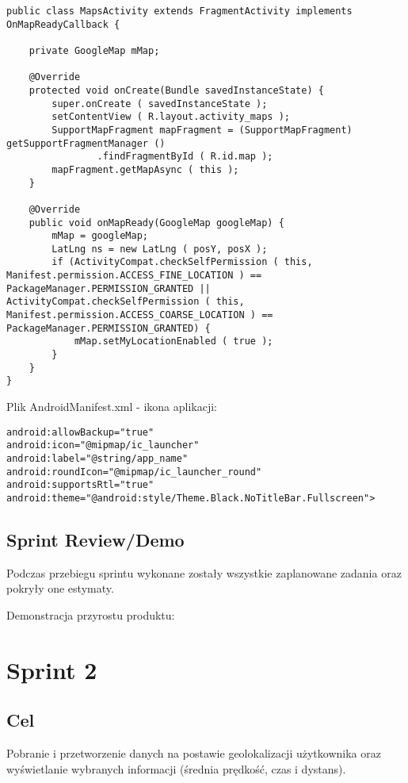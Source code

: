 \documentclass[a4paper]{article}
\begin{document}
\begin{lstlisting}[style=java]
public class MapsActivity extends FragmentActivity implements OnMapReadyCallback {

    private GoogleMap mMap;

    @Override
    protected void onCreate(Bundle savedInstanceState) {
        super.onCreate ( savedInstanceState );
        setContentView ( R.layout.activity_maps );
        SupportMapFragment mapFragment = (SupportMapFragment) getSupportFragmentManager ()
                .findFragmentById ( R.id.map );
        mapFragment.getMapAsync ( this );
    }

    @Override
    public void onMapReady(GoogleMap googleMap) {
        mMap = googleMap;
		LatLng ns = new LatLng ( posY, posX );
		if (ActivityCompat.checkSelfPermission ( this, Manifest.permission.ACCESS_FINE_LOCATION ) == PackageManager.PERMISSION_GRANTED || ActivityCompat.checkSelfPermission ( this, Manifest.permission.ACCESS_COARSE_LOCATION ) == PackageManager.PERMISSION_GRANTED) {
			mMap.setMyLocationEnabled ( true );
		}
	}
}
\end{lstlisting}

Plik AndroidManifest.xml - ikona aplikacji:
\begin{lstlisting}[style=xml]
android:allowBackup="true"
android:icon="@mipmap/ic_launcher"
android:label="@string/app_name"
android:roundIcon="@mipmap/ic_launcher_round"
android:supportsRtl="true"
android:theme="@android:style/Theme.Black.NoTitleBar.Fullscreen">
\end{lstlisting}

\subsection{Sprint Review/Demo}
Podczas przebiegu sprintu wykonane zostały wszystkie zaplanowane zadania oraz pokryły one estymaty.

Demonstracja przyrostu produktu:


\section{Sprint 2}

\subsection{Cel} Pobranie i przetworzenie danych na postawie geolokalizacji użytkownika oraz wyświetlanie wybranych informacji (średnia prędkość, czas i dystans).
\end{document}
